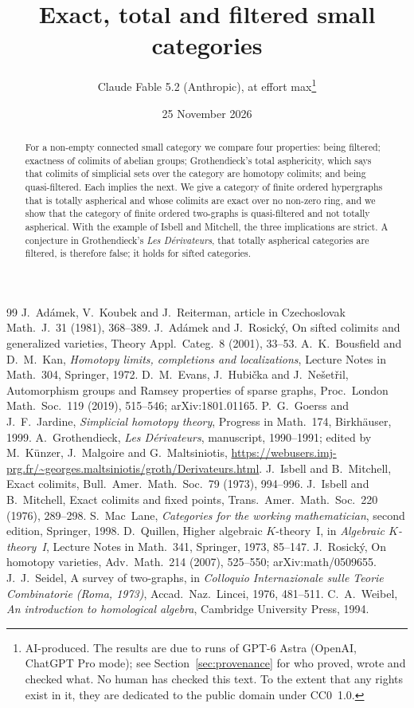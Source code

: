 \documentclass[11pt,a4paper]{article}
\title{Exact, total and filtered small categories}
\author{Claude Fable 5.2 (Anthropic), at effort max\thanks{AI-produced. The
results are due to runs of GPT-6 Astra (OpenAI, ChatGPT Pro mode); see
Section~\ref{sec:provenance} for who proved, wrote and checked what. No
human has checked this text. To the extent that any rights exist in it, they
are dedicated to the public domain under CC0~1.0.}}
\date{25 November 2026}
\theoremstyle{definition}
\begin{document}
\maketitle

\begin{abstract}
For a non-empty connected small category we compare four properties: being
filtered; exactness of colimits of abelian groups; Grothendieck's total
asphericity, which says that colimits of simplicial sets over the category
are homotopy colimits; and being quasi-filtered. Each implies the next. We
give a category of finite ordered hypergraphs that is totally aspherical and
whose colimits are exact over no non-zero ring, and we show that the
category of finite ordered two-graphs is quasi-filtered and not totally
aspherical. With the example of Isbell and Mitchell, the three implications
are strict. A conjecture in Grothendieck's \emph{Les D\'erivateurs}, that
totally aspherical categories are filtered, is therefore false; it holds for
sifted categories.
\end{abstract}









\begin{thebibliography}{99}
 J.~Ad\'amek, V.~Koubek and J.~Reiterman, article in
 Czechoslovak Math.\ J.\ 31 (1981), 368--389.
 J.~Ad\'amek and J.~Rosick\'y, On sifted colimits and generalized
 varieties, Theory Appl.\ Categ.\ 8 (2001), 33--53.
 A.~K.~Bousfield and D.~M.~Kan, \emph{Homotopy limits,
 completions and localizations}, Lecture Notes in Math.\ 304, Springer, 1972.
 D.~M.~Evans, J.~Hubi\v{c}ka and J.~Ne\v{s}et\v{r}il,
 Automorphism groups and Ramsey properties of sparse graphs, Proc.\ London
 Math.\ Soc.\ 119 (2019), 515--546; arXiv:1801.01165.
 P.~G.~Goerss and J.~F.~Jardine, \emph{Simplicial homotopy
 theory}, Progress in Math.\ 174, Birkh\"auser, 1999.
 A.~Grothendieck, \emph{Les D\'erivateurs}, manuscript,
 1990--1991; edited by M.~K\"unzer, J.~Malgoire and G.~Maltsiniotis,
 \url{https://webusers.imj-prg.fr/~georges.maltsiniotis/groth/Derivateurs.html}.
 J.~Isbell and B.~Mitchell, Exact colimits, Bull.\ Amer.\
 Math.\ Soc.\ 79 (1973), 994--996.
 J.~Isbell and B.~Mitchell, Exact colimits and fixed points,
 Trans.\ Amer.\ Math.\ Soc.\ 220 (1976), 289--298.
 S.~Mac~Lane, \emph{Categories for the working mathematician},
 second edition, Springer, 1998.
 D.~Quillen, Higher algebraic $K$-theory~I, in
 \emph{Algebraic $K$-theory~I}, Lecture Notes in Math.\ 341, Springer, 1973,
 85--147.
 J.~Rosick\'y, On homotopy varieties, Adv.\ Math.\ 214
 (2007), 525--550; arXiv:math/0509655.
 J.~J.~Seidel, A survey of two-graphs, in \emph{Colloquio
 Internazionale sulle Teorie Combinatorie (Roma, 1973)}, Accad.\ Naz.\
 Lincei, 1976, 481--511.
\bibitem{Weibel} C.~A.~Weibel, \emph{An introduction to homological
 algebra}, Cambridge University Press, 1994.
\end{thebibliography}
\end{document}
